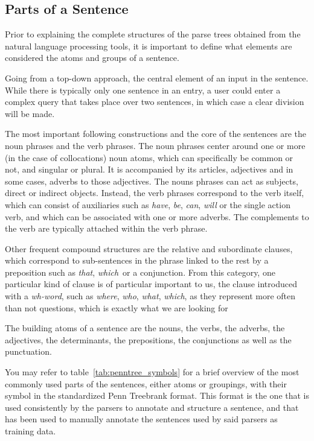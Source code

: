 \subsection{Parts of a Sentence} %
\label{sub:parts_of_a_sentence}

Prior to explaining the complete structures of the parse trees obtained from the natural language processing tools, it is important to define what elements are considered the atoms and groups of a sentence.

Going from a top-down approach, the central element of an input in the sentence. While there is typically only one sentence in an entry, a user could enter a complex query that takes place over two sentences, in which case a clear division will be made.

The most important following constructions and the core of the sentences are the noun phrases and the verb phrases. The noun phrases center around one or more (in the case of collocations) noun atoms, which can specifically be common or not, and singular or plural. It is accompanied by its articles, adjectives and in some cases, adverbs to those adjectives. The nouns phrases can act as subjects, direct or indirect objects. Instead, the verb phrases correspond to the verb itself, which can consist of auxiliaries such as \emph{have}, \emph{be}, \emph{can}, \emph{will} or the single action verb, and which can be associated with one or more adverbs. The complements to the verb are typically attached within the verb phrase.

Other frequent compound structures are the relative and subordinate clauses, which correspond to sub-sentences in the phrase linked to the rest by a preposition such as \emph{that}, \emph{which}\ or a conjunction. From this category, one particular kind of clause is of particular important to us, the clause introduced with a \emph{wh-word}, such as \emph{where}, \emph{who}, \emph{what}, \emph{which}, as they represent more often than not questions, which is exactly what we are looking for

The building atoms of a sentence are the nouns, the verbs, the adverbs, the adjectives, the determinants, the prepositions, the conjunctions as well as the punctuation.

You may refer to table~\ref{tab:penntree_symbols} for a brief overview of the most commonly used parts of the sentences, either atoms or groupings, with their symbol in the standardized Penn Treebrank format. This format is the one that is used consistently by the parsers to annotate and structure a sentence, and that has been used to manually annotate the sentences used by said parsers as training data.

